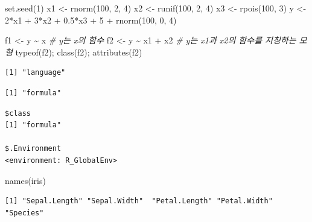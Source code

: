 \documentclass[
  11pt,
]{krantz}
\newenvironment{Shaded}{\begin{snugshade}}{\end{snugshade}}
\newcommand{\CommentTok}[1]{\textcolor[rgb]{0.37,0.37,0.37}{\textit{#1}}}
\newcommand{\DecValTok}[1]{\textcolor[rgb]{0.06,0.06,0.06}{#1}}
\newcommand{\FloatTok}[1]{\textcolor[rgb]{0.06,0.06,0.06}{#1}}
\newcommand{\FunctionTok}[1]{\textcolor[rgb]{0,0,0}{#1}}
\newcommand{\NormalTok}[1]{#1}
\newcommand{\OtherTok}[1]{\textcolor[rgb]{0.37,0.37,0.37}{#1}}
\newcommand{\SpecialCharTok}[1]{\textcolor[rgb]{0,0,0}{#1}}
\begin{document}
\begin{Shaded}
\begin{Highlighting}[]
\FunctionTok{set.seed}\NormalTok{(}\DecValTok{1}\NormalTok{)}
\NormalTok{x1 }\OtherTok{\textless{}{-}} \FunctionTok{rnorm}\NormalTok{(}\DecValTok{100}\NormalTok{, }\DecValTok{2}\NormalTok{, }\DecValTok{4}\NormalTok{)}
\NormalTok{x2 }\OtherTok{\textless{}{-}} \FunctionTok{runif}\NormalTok{(}\DecValTok{100}\NormalTok{, }\DecValTok{2}\NormalTok{, }\DecValTok{4}\NormalTok{)}
\NormalTok{x3 }\OtherTok{\textless{}{-}} \FunctionTok{rpois}\NormalTok{(}\DecValTok{100}\NormalTok{, }\DecValTok{3}\NormalTok{)}
\NormalTok{y }\OtherTok{\textless{}{-}} \DecValTok{2}\SpecialCharTok{*}\NormalTok{x1 }\SpecialCharTok{+} \DecValTok{3}\SpecialCharTok{*}\NormalTok{x2 }\SpecialCharTok{+} \FloatTok{0.5}\SpecialCharTok{*}\NormalTok{x3 }\SpecialCharTok{+} \DecValTok{5} \SpecialCharTok{+} \FunctionTok{rnorm}\NormalTok{(}\DecValTok{100}\NormalTok{, }\DecValTok{0}\NormalTok{, }\DecValTok{4}\NormalTok{)}

\NormalTok{f1 }\OtherTok{\textless{}{-}}\NormalTok{ y }\SpecialCharTok{\textasciitilde{}}\NormalTok{ x }\CommentTok{\# y는 x의 함수}
\NormalTok{f2 }\OtherTok{\textless{}{-}}\NormalTok{ y }\SpecialCharTok{\textasciitilde{}}\NormalTok{ x1 }\SpecialCharTok{+}\NormalTok{ x2 }\CommentTok{\# y는 x1과 x2의 함수를 지칭하는 모형}
\FunctionTok{typeof}\NormalTok{(f2); }\FunctionTok{class}\NormalTok{(f2); }\FunctionTok{attributes}\NormalTok{(f2)}
\end{Highlighting}
\end{Shaded}

\begin{verbatim}
[1] "language"
\end{verbatim}

\begin{verbatim}
[1] "formula"
\end{verbatim}

\begin{verbatim}
$class
[1] "formula"

$.Environment
<environment: R_GlobalEnv>
\end{verbatim}

\begin{Shaded}
\begin{Highlighting}[]
\FunctionTok{names}\NormalTok{(iris)}
\end{Highlighting}
\end{Shaded}

\begin{verbatim}
[1] "Sepal.Length" "Sepal.Width"  "Petal.Length" "Petal.Width"  "Species"     
\end{verbatim}
\end{document}
